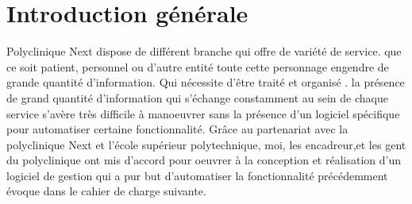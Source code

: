 \chapter*{Introduction générale}
Polyclinique Next dispose de différent branche qui offre de variété de service. que ce soit  patient, personnel ou d'autre entité toute cette personnage engendre de grande quantité d'information. Qui nécessite d'être traité et organisé .  la présence de grand quantité d'information qui s'échange constamment au sein de chaque service s'avère très difficile à manoeuvrer sans la présence d'un logiciel spécifique pour automatiser certaine fonctionnalité. 
  		Grâce au partenariat avec la polyclinique Next et l'école supérieur polytechnique, moi, les encadreur,et les gent du polyclinique ont mis d'accord pour oeuvrer à la conception et réalisation d'un logiciel de gestion qui a pur but d'automatiser la fonctionnalité précédemment évoque dans le cahier de charge suivante.

